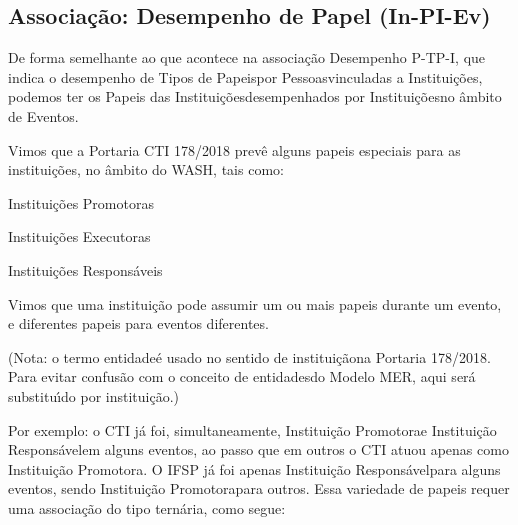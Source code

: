 \documentclass[
12pt,		%
openright,	%
twoside,  %
a4paper,			%
chapter=TITLE,		%
english,			%
french,				%
spanish,			%
brazil				%
]{USPSC-classe/USPSC}
\begin{document}
\subsection[Associa\c{c}\~ao: Desempenho de Papel (In-PI-Ev)]{Associa\c{c}\~ao: Desempenho de Papel (In-PI-Ev)}\label{Associa\c{c}\~ao: Desempenho de Papel (In-PI-Ev)}
De forma semelhante ao que acontece na associa\c{c}\~ao \textquotedbl Desempenho P-TP-I\textquotedbl , que indica o desempenho de \textquotedbl Tipos de Papeis\textquotedbl  por \textquotedbl Pessoas\textquotedbl  vinculadas a \textquotedbl Institui\c{c}\~oes\textquotedbl , podemos ter os \textquotedbl Papeis das Institui\c{c}\~oes\textquotedbl  desempenhados por \textquotedbl Institui\c{c}\~oes\textquotedbl  no \^ambito de \textquotedbl Eventos\textquotedbl .









Vimos que a Portaria CTI 178/2018 prev\^e alguns papeis especiais para as institui\c{c}\~oes, no \^ambito do WASH, tais como:










\begin{alineas}
\item Institui\c{c}\~oes Promotoras
\item Institui\c{c}\~oes Executoras
\item Institui\c{c}\~oes Respons\'aveis
\end{alineas}

Vimos que uma institui\c{c}\~ao pode assumir um ou mais papeis durante um evento, e diferentes papeis para eventos diferentes.









(Nota: o termo \textquotedbl entidade\textquotedbl  \'e usado no sentido de \textquotedbl institui\c{c}\~ao\textquotedbl  na Portaria 178/2018. Para evitar confus\~ao com o conceito de \textquotedbl entidades\textquotedbl  do Modelo MER, aqui ser\'a substitu\'{\i}do por \textquotedbl institui\c{c}\~ao\textquotedbl .)









Por exemplo: o CTI j\'a foi, simultaneamente, \textquotedbl Institui\c{c}\~ao Promotora\textquotedbl  e \textquotedbl Institui\c{c}\~ao Respons\'avel\textquotedbl  em alguns eventos, ao passo que em outros o CTI atuou apenas como \textquotedbl Institui\c{c}\~ao Promotora\textquotedbl . O IFSP j\'a foi apenas \textquotedbl Institui\c{c}\~ao Respons\'avel\textquotedbl  para alguns eventos, sendo \textquotedbl Institui\c{c}\~ao Promotora\textquotedbl  para outros. Essa variedade de papeis requer uma associa\c{c}\~ao do tipo tern\'aria, como segue:
\end{document}
